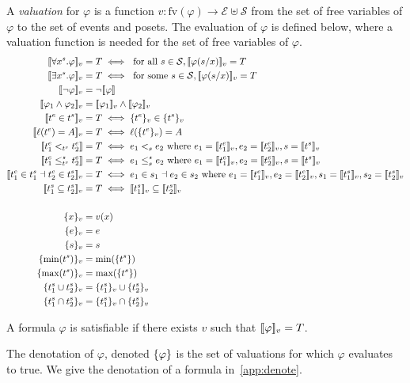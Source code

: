 A \emph{valuation} for $\varphi$ is a function
$v:\text{fv}(\varphi)\to\mathcal{E}\uplus\mathcal{S}$
from the set of free variables of $\varphi$ to the set of events and posets.
%
The evaluation of $\varphi$ is defined below, where a valuation function is needed for the set of free variables of $\varphi$.
\begin{align*}
  \enc{\forall x^s.\varphi}_{v} &= T \iff\text{ for all }s\in\mathcal{S}, \enc{\varphi(s/x)}_{v} = T\\
  \enc{\exists x^s.\varphi}_{v} &= T \iff\text{ for some }s\in\mathcal{S}, \enc{\varphi(s/x)}_{v} = T\\
  \enc{\neg\varphi}_v &= \neg\enc{\varphi} \\
  \enc{\varphi_1\wedge\varphi_2}_v &= \enc{\varphi_1}_v\wedge\enc{\varphi_2}_v\\
  \enc{t^e\in t^s}_v &= T\iff\enct{t^e}_v\in\enct{t^s}_v\\
  \enc{\labl(t^e) = A}_v &= T\iff\labl(\enct{t^e}_v)=A\\
  \enc{t^e_1 <_{t^s} t^e_2} &= T\iff e_1 <_s e_2\text{ where }e_1 = \enc{t^e_1}_v,e_2 = \enc{t^e_2}_v,s = \enc{t^s}_v\\
  \enc{t^e_1 \tleq_{t^s} t^e_2} &= T\iff e_1 \tleq_s e_2\text{ where }e_1 = \enc{t^e_1}_v,e_2 = \enc{t^e_2}_v,s = \enc{t^s}_v\\
  \enc{t^e_1\in t^s_1 \dashv t^e_2\in t^s_2}_v &= T\iff e_1\in s_1 \dashv e_2\in s_2\text{ where }
  e_1 = \enc{t^e_1}_v,e_2 = \enc{t^e_2}_v,s_1 = \enc{t^s_1}_v,s_2 = \enc{t^s_2}_v\\
  \enc{t^s_1\subseteq t^s_2}_v &= T\iff\enc{t^s_1}_v\subseteq \enc{t^s_2}_v\\
  \\
  \enct{x}_{v} &= v(x)\\
  \enct{e}_{v} &= e\\
  \enct{s}_{v} &= s\\
  \enct{\text{min}(t^s)}_{v} &= \text{min}(\enct{t^s})\\
  \enct{\text{max}(t^s)}_{v} &= \text{max}(\enct{t^s})\\
  \enct{t^s_1 \cup t^s_2}_{v} &= \enct{t^s_1}_v \cup \enct{t^s_2}_{v}\\
  \enct{t^s_1 \cap t^s_2}_{v} &= \enct{t^s_1}_v \cap \enct{t^s_2}_{v}\\
\end{align*}

A formula $\varphi$ is satisfiable if there exists $v$ such that $[\![\varphi]\!]_v = T$.

The denotation of $\varphi$, denoted $\{\varphi\}$ is the set of valuations for which $\varphi$ evaluates to true. We give the denotation of a formula in~\autoref{app:denote}.
